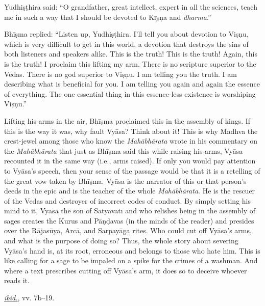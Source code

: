 \begin{pullquote}
Yudhiṣṭhira said: “O grandfather, great intellect, expert in all the sciences, teach me in such a way that I should be devoted to Kr̥ṣṇa and \emph{dharma}.” \medskip


Bhīṣma replied: “Listen up, Yudhiṣṭhira. I’ll tell you about devotion to Viṣṇu, which is very difficult to get in this world, a devotion that destroys the sins of both listeners and speakers alike. This is the truth! This is the truth! Again, this is the truth! I proclaim this lifting my arm. There is no scripture superior to the Vedas. There is no god superior to Viṣṇu. I am telling you the truth. I am describing what is beneficial for you. I am telling you again and again the essence of everything. The one essential thing in this essence-less existence is worshiping Viṣṇu.”\medskip


Lifting his arms in the air, Bhīṣma proclaimed this in the assembly of kings. If this is the way it was, why fault Vyāsa? Think about it! This is why Madhva  \Dash  the crest-jewel among those who know the \emph{Mahābhārata}  \Dash  wrote in his commentary on the \emph{Mahābhārata} that just as Bhīṣma said this while raising his arms, Vyāsa recounted it in the same way (i.e., arms raised). If only you would pay attention to Vyāsa’s speech, then your sense of the passage would be that it is a retelling of the great vow taken by Bhīṣma. Vyāsa is the narrator of this or that person’s deeds in the epic and is the teacher of the whole \emph{Mahābhārata}. He is the rescuer of the Vedas and destroyer of incorrect codes of conduct. By simply setting his mind to it, Vyāsa  \Dash  the son of Satyavatī and who relishes being in the assembly of sages  \Dash  creates the Kurus and Pāṇḍavas (in the minds of the reader) and presides over the Rājasūya, Arcā, and Sarpayāga rites. Who could cut off Vyāsa’s arms, and what is the purpose of doing so? Thus, the whole story about severing Vyāsa’s hand is, at its root, erroneous and belongs to those who hate him. This is like calling for a sage to be impaled on a spike for the crimes of a washman. And where a text prescribes cutting off Vyāsa’s arm, it does so to deceive whoever reads it.


\medskip\hfill\begin{minipage}{0.9\textwidth}\small\hfill
\hyperref[VP]{\emph{ibid.}}, vv. 7b–19.\end{minipage}\hspace{2em}
\end{pullquote}

